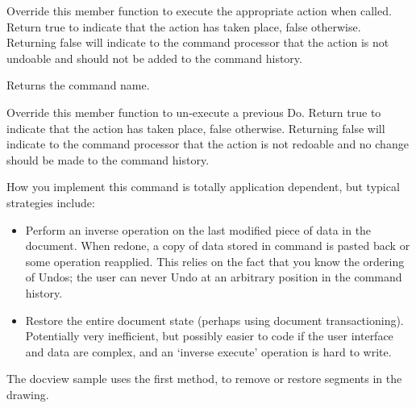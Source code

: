 Override this member function to execute the appropriate action when called.
Return true to indicate that the action has taken place, false otherwise.
Returning false will indicate to the command processor that the action is
not undoable and should not be added to the command history.

\label{wxcommandgetname}


Returns the command name.

\label{wxcommandundo}


Override this member function to un-execute a previous Do.
Return true to indicate that the action has taken place, false otherwise.
Returning false will indicate to the command processor that the action is
not redoable and no change should be made to the command history.

How you implement this command is totally application dependent, but typical
strategies include:

\begin{itemize}\itemsep=0pt
\item Perform an inverse operation on the last modified piece of
data in the document. When redone, a copy of data stored in command
is pasted back or some operation reapplied. This relies on the fact that
you know the ordering of Undos; the user can never Undo at an arbitrary position
in the command history.
\item Restore the entire document state (perhaps using document transactioning).
Potentially very inefficient, but possibly easier to code if the user interface
and data are complex, and an `inverse execute' operation is hard to write.
\end{itemize}

The docview sample uses the first method, to remove or restore segments
in the drawing.


